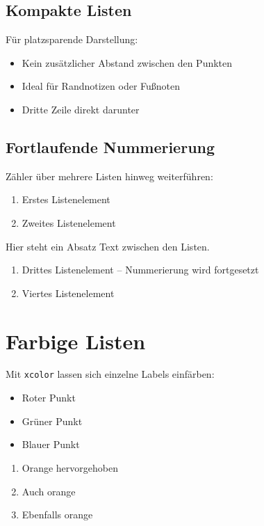 \section{Kompakte Listen}

Für platzsparende Darstellung:

\begin{itemize}[nosep]
    \item Kein zusätzlicher Abstand zwischen den Punkten
    \item Ideal für Randnotizen oder Fußnoten
    \item Dritte Zeile direkt darunter
\end{itemize}

\section{Fortlaufende Nummerierung}

Zähler über mehrere Listen hinweg weiterführen:

\begin{enumerate}[label=\arabic*., series=beispiel]
    \item Erstes Listenelement
    \item Zweites Listenelement
\end{enumerate}

Hier steht ein Absatz Text zwischen den Listen.

\begin{enumerate}[label=\arabic*., resume=beispiel]
    \item Drittes Listenelement -- Nummerierung wird fortgesetzt
    \item Viertes Listenelement
\end{enumerate}

\chapter{Farbige Listen}
\label{sec:farbig}

Mit \texttt{xcolor} lassen sich einzelne Labels einfärben:

\begin{itemize}
    \item[\textcolor{red}{$\bullet$}] Roter Punkt
    \item[\textcolor{green!60!black}{$\bullet$}] Grüner Punkt
    \item[\textcolor{blue}{$\bullet$}] Blauer Punkt
\end{itemize}

\begin{enumerate}[label=\textcolor{orange}{\textbf{\Alph*.}}]
    \item Orange hervorgehoben
    \item Auch orange
    \item Ebenfalls orange
\end{enumerate}